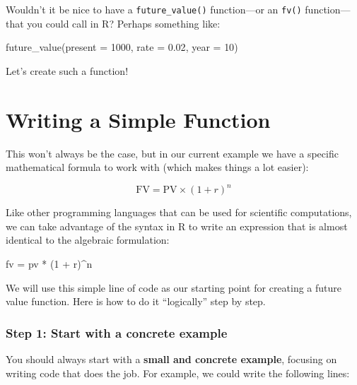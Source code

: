 \documentclass[
]{book}
\newenvironment{Shaded}{\begin{snugshade}}{\end{snugshade}}
\newcommand{\AttributeTok}[1]{\textcolor[rgb]{0.77,0.63,0.00}{#1}}
\newcommand{\DecValTok}[1]{\textcolor[rgb]{0.00,0.00,0.81}{#1}}
\newcommand{\FloatTok}[1]{\textcolor[rgb]{0.00,0.00,0.81}{#1}}
\newcommand{\FunctionTok}[1]{\textcolor[rgb]{0.00,0.00,0.00}{#1}}
\newcommand{\NormalTok}[1]{#1}
\newcommand{\OtherTok}[1]{\textcolor[rgb]{0.56,0.35,0.01}{#1}}
\newcommand{\SpecialCharTok}[1]{\textcolor[rgb]{0.00,0.00,0.00}{#1}}
\begin{document}
Wouldn't it be nice to have a \texttt{future\_value()} function---or an \texttt{fv()}
function---that you could call in R? Perhaps something like:

\begin{Shaded}
\begin{Highlighting}[]
\FunctionTok{future\_value}\NormalTok{(}\AttributeTok{present =} \DecValTok{1000}\NormalTok{, }\AttributeTok{rate =} \FloatTok{0.02}\NormalTok{, }\AttributeTok{year =} \DecValTok{10}\NormalTok{)}
\end{Highlighting}
\end{Shaded}

Let's create such a function!

\hypertarget{writing-a-simple-function}{%
\section{Writing a Simple Function}\label{writing-a-simple-function}}

This won't always be the case, but in our current example we have a specific
mathematical formula to work with (which makes things a lot easier):

\[
\text{FV} = \text{PV} \times (1 + r)^n
\]

Like other programming languages that can be used for scientific computations,
we can take advantage of the syntax in R to write an expression that is almost
identical to the algebraic formulation:

\begin{Shaded}
\begin{Highlighting}[]
\NormalTok{fv }\OtherTok{=}\NormalTok{ pv }\SpecialCharTok{*}\NormalTok{ (}\DecValTok{1} \SpecialCharTok{+}\NormalTok{ r)}\SpecialCharTok{\^{}}\NormalTok{n}
\end{Highlighting}
\end{Shaded}

We will use this simple line of code as our starting point for creating a
future value function. Here is how to do it ``logically'' step by step.

\hypertarget{step-1-start-with-a-concrete-example}{%
\subsubsection*{Step 1: Start with a concrete example}\label{step-1-start-with-a-concrete-example}}

You should always start with a \textbf{small and concrete example}, focusing
on writing code that does the job. For example, we could write the following
lines:
\end{document}
